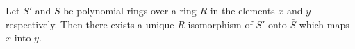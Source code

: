 Let $S'$ and $\bar{S}$ be polynomial rings over a ring $R$ in the elements $x$ and $y$ respectively. Then there exists a unique $R$-isomorphism of $S'$ onto $\bar{S}$ which maps $x$ into $y$.
